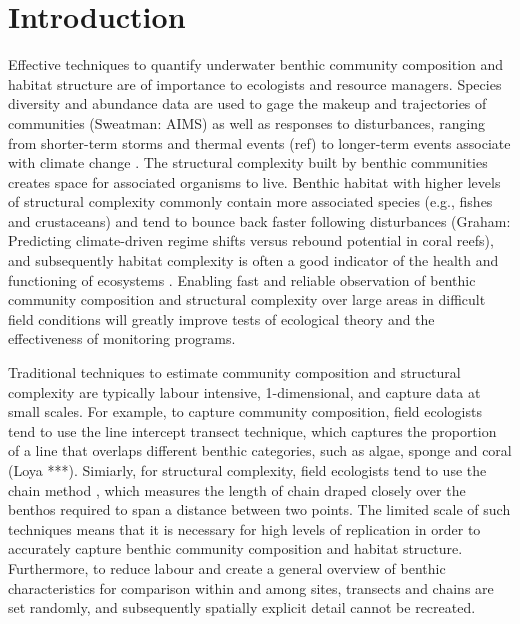 \section{Introduction} 


Effective techniques to quantify underwater benthic community composition and habitat structure are of importance to ecologists and resource managers. Species diversity and abundance data are used to gage the makeup and trajectories of communities (Sweatman: AIMS) as well as responses to disturbances, ranging from shorter-term storms and thermal events (ref) to longer-term events associate with climate change \cite{pending}. The structural complexity built by benthic communities creates space for associated organisms to live. Benthic habitat with higher levels of structural complexity commonly contain more associated species (e.g., fishes and crustaceans) \cite{pending} and tend to bounce back faster following disturbances (Graham: Predicting climate-driven regime shifts versus rebound potential in coral reefs), and subsequently habitat complexity is often a good indicator of the health and functioning of ecosystems \cite{pending}. Enabling fast and reliable observation of benthic community composition and structural complexity over large areas in difficult field conditions will greatly improve tests of ecological theory and the effectiveness of monitoring programs.

\newline


Traditional techniques to estimate community composition and structural complexity are typically labour intensive, 1-dimensional, and capture data at small scales. For example, to capture community composition, field ecologists tend to use the line intercept transect technique, which captures the proportion of a line that overlaps different benthic categories, such as algae, sponge and coral (Loya ***). Simiarly, for structural complexity, field ecologists tend to use the chain method \cite{Luckhurst_1978} \cite{Friedlander_1998}, which measures the length of chain draped closely over the benthos required to span a distance between two points. The limited scale of such techniques means that it is necessary for high levels of replication in order to accurately capture benthic community composition and habitat structure. Furthermore, to reduce labour and create a general overview of benthic characteristics for comparison within and among sites, transects and chains are set randomly, and subsequently spatially explicit detail cannot be recreated. 

